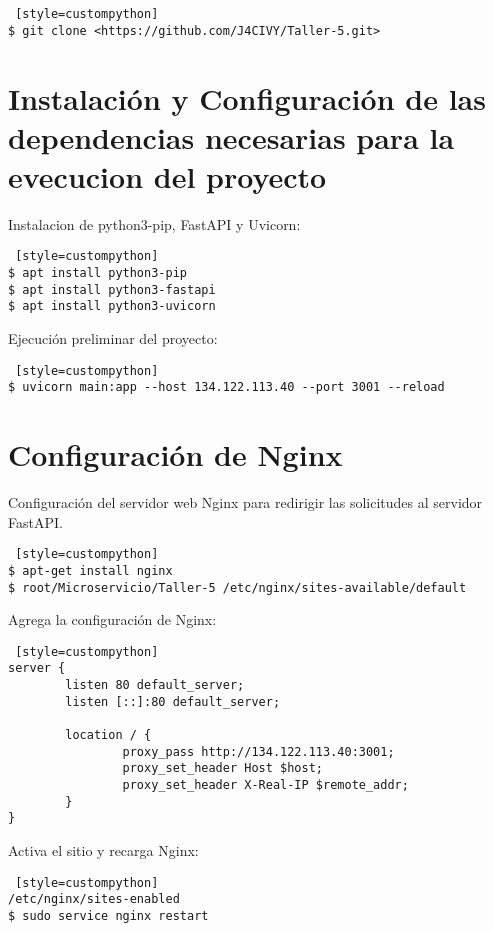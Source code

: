 \documentclass[journal]{IEEEtran}
\begin{document}
\begin{lstlisting} [style=custompython]
$ git clone <https://github.com/J4CIVY/Taller-5.git>
\end{lstlisting}

\section{Instalación y Configuración de las dependencias necesarias para la evecucion del proyecto}

Instalacion de python3-pip,  FastAPI y Uvicorn:

\begin{lstlisting} [style=custompython]
$ apt install python3-pip
$ apt install python3-fastapi
$ apt install python3-uvicorn
\end{lstlisting}

Ejecución preliminar del proyecto:

\begin{lstlisting} [style=custompython]
$ uvicorn main:app --host 134.122.113.40 --port 3001 --reload
\end{lstlisting}

\section{Configuración de Nginx}
Configuración del servidor web Nginx para redirigir las solicitudes al servidor FastAPI.

\begin{lstlisting} [style=custompython]
$ apt-get install nginx
$ root/Microservicio/Taller-5 /etc/nginx/sites-available/default
\end{lstlisting}

Agrega la configuración de Nginx:

\begin{lstlisting} [style=custompython]
server {
        listen 80 default_server;
        listen [::]:80 default_server;

        location / {
                proxy_pass http://134.122.113.40:3001;
                proxy_set_header Host $host;
                proxy_set_header X-Real-IP $remote_addr;
        }
}
\end{lstlisting}

Activa el sitio y recarga Nginx:

\begin{lstlisting} [style=custompython]
/etc/nginx/sites-enabled
$ sudo service nginx restart
\end{lstlisting}
\end{document}
